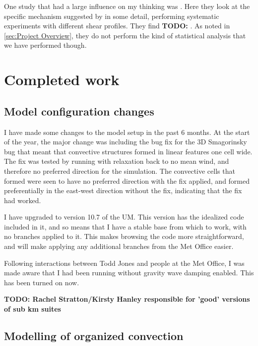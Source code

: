 \documentclass[11pt,a4paper]{article}
\newcommand\todo[1]{\textbf{TODO: #1}}
\begin{document}
One study that had a large influence on my thinking was \cite{RE2001}. Here they look at the specific mechanism suggested by \cite{RKW1988} in some detail, performing systematic experiments with different shear profiles. They find \todo{}. As noted in \ref{sec:Project Overview}, they do not perform the kind of statistical analysis that we have performed though.




\section{Completed work}

\subsection{Model configuration changes}
\label{sec:modelling_config}

I have made some changes to the model setup in the past 6 months. At the start of the year, the major change was including the bug fix for the 3D Smagorinsky bug that meant that convective structures formed in linear features one cell wide. The fix was tested by running with relaxation back to no mean wind, and therefore no preferred direction for the simulation. The convective cells that formed were seen to have no preferred direction with the fix applied, and formed preferentially in the east-west direction without the fix, indicating that the fix had worked.

I have upgraded to version 10.7 of the UM. This version has the idealized code included in it, and so means that I have a stable base from which to work, with no branches applied to it. This makes browsing the code more straightforward, and will make applying any additional branches from the Met Office easier.

Following interactions between Todd Jones and people at the Met Office, I was made aware that I had been running without gravity wave damping enabled. This has been turned on now.

\todo{Rachel Stratton/Kirsty Hanley responsible for 'good' versions of sub km suites}


\subsection{Modelling of organized convection}
\label{sec:modelling_org}
\end{document}
